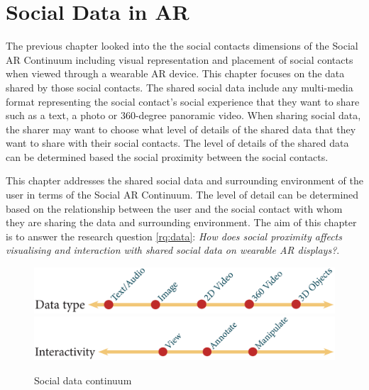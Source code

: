 \chapter{Social Data in AR} 
\label{ch:data} 


The previous chapter looked into the the social contacts dimensions of the Social AR Continuum including visual representation and placement of social contacts when viewed through a wearable AR device. This chapter focuses on the data shared by those social contacts. The shared social data include any multi-media format representing the social contact's social experience that they want to share such as a text, a photo or 360-degree panoramic video. When sharing social data, the sharer may want to choose what level of details of the shared data that they want to share with their social contacts. The level of details of the shared data can be determined based the social proximity between the social contacts. 

This chapter addresses the shared social data and surrounding environment of the user in terms of the Social AR Continuum. The level of detail can be determined based on the relationship between the user and the social contact with whom they are sharing the data and surrounding environment. The aim of this chapter is to answer the research question \ref{rq:data}: \textit{How does social proximity affects visualising and interaction with shared social data on wearable AR displays?}. 


\begin{figure}[h]
  \centering
  \includegraphics[width=\columnwidth]{images/continuum/continuum4.2-03.eps}
  \includegraphics[width=\columnwidth]{images/continuum/continuum4.2-04.eps}
  \caption{Social data continuum}
  \label{fig:surrounding:data-continuum}
\end{figure}

